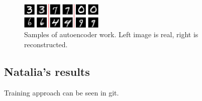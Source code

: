 \documentclass{article}
\begin{document}
    \begin{center}
        \begin{figure}[H]
            \centering
            \includegraphics[width=0.35\textwidth]{figures/aae_sampling_real_reconstructed.png}
            \caption{Samples of autoencoder work. Left image is real, right is reconstructed.}
        \end{figure}
    \end{center}
    \subsection{Natalia's results}
    Training approach can be seen in git.
\end{document}
